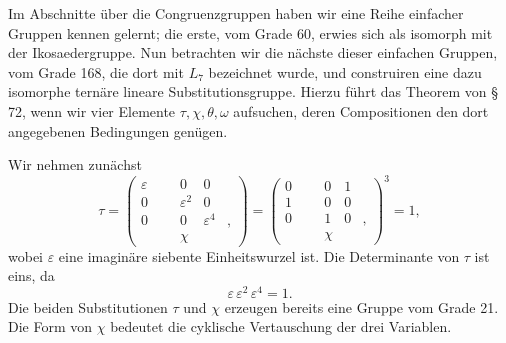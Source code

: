 \documentclass[11pt]{article}
\providecommand{\eps}{\varepsilon}
\providecommand{\eps}{\varepsilon}
\providecommand{\mat}[4]{\begin{pmatrix}#1&#2\\#3&#4\end{pmatrix}}
\providecommand{\mat}[4]{\begin{pmatrix}#1&#2\\#3&#4\end{pmatrix}}
\providecommand{\mat}[1]{\begin{pmatrix}#1\end{pmatrix}}
\begin{document}
Im Abschnitte über die Congruenzgruppen haben wir eine Reihe einfacher Gruppen kennen gelernt; die erste, vom Grade 60, erwies sich als isomorph mit der Ikosaedergruppe. Nun betrachten wir die nächste dieser einfachen Gruppen, vom Grade 168, die dort mit \(L_7\) bezeichnet wurde, und construiren eine dazu isomorphe ternäre lineare Substitutionsgruppe. Hierzu führt das Theorem von \S\,72, wenn wir vier Elemente \(\tau,\chi,\theta,\omega\) aufsuchen, deren Compositionen den dort angegebenen Bedingungen genügen.

Wir nehmen zunächst
\begin{equation}
\tau=\mat{\eps&0&0\\0&\eps^2&0\\0&0&\eps^4},
\qquad
\chi=\mat{0&0&1\\1&0&0\\0&1&0},
\qquad \chi^3=1,
\tag{1}
\end{equation}
wobei \(\eps\) eine imaginäre siebente Einheitswurzel ist. Die Determinante von \(\tau\) ist eins, da
\begin{equation}
\eps\,\eps^2\,\eps^4=1.
\tag{2}
\end{equation}
Die beiden Substitutionen \(\tau\) und \(\chi\) erzeugen bereits eine Gruppe vom Grade 21. Die Form von \(\chi\) bedeutet die cyklische Vertauschung der drei Variablen.
\end{document}
